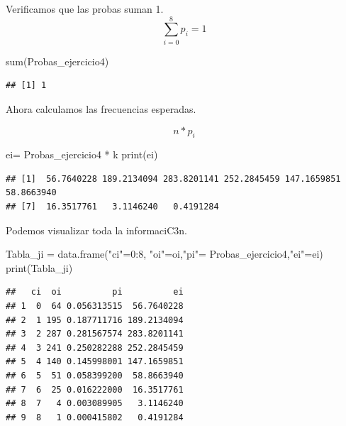 \documentclass[
]{article}
\newenvironment{Shaded}{\begin{snugshade}}{\end{snugshade}}
\newcommand{\DecValTok}[1]{\textcolor[rgb]{0.00,0.00,0.81}{#1}}
\newcommand{\FunctionTok}[1]{\textcolor[rgb]{0.00,0.00,0.00}{#1}}
\newcommand{\NormalTok}[1]{#1}
\newcommand{\OtherTok}[1]{\textcolor[rgb]{0.56,0.35,0.01}{#1}}
\newcommand{\SpecialCharTok}[1]{\textcolor[rgb]{0.00,0.00,0.00}{#1}}
\newcommand{\StringTok}[1]{\textcolor[rgb]{0.31,0.60,0.02}{#1}}
\begin{document}
Verificamos que las probas suman 1. \[\sum_{i=0}^{8} p_{i} = 1\]

\begin{Shaded}
\begin{Highlighting}[]
\FunctionTok{sum}\NormalTok{(Probas\_ejercicio4)}
\end{Highlighting}
\end{Shaded}

\begin{verbatim}
## [1] 1
\end{verbatim}

Ahora calculamos las frecuencias esperadas.

\[n * p_{i}\]

\begin{Shaded}
\begin{Highlighting}[]
\NormalTok{ei}\OtherTok{=}\NormalTok{ Probas\_ejercicio4 }\SpecialCharTok{*}\NormalTok{ k }
\FunctionTok{print}\NormalTok{(ei)}
\end{Highlighting}
\end{Shaded}

\begin{verbatim}
## [1]  56.7640228 189.2134094 283.8201141 252.2845459 147.1659851  58.8663940
## [7]  16.3517761   3.1146240   0.4191284
\end{verbatim}

Podemos visualizar toda la informaciC3n.

\begin{Shaded}
\begin{Highlighting}[]
\NormalTok{Tabla\_ji }\OtherTok{=} \FunctionTok{data.frame}\NormalTok{(}\StringTok{"ci"}\OtherTok{=}\DecValTok{0}\SpecialCharTok{:}\DecValTok{8}\NormalTok{, }\StringTok{"oi"}\OtherTok{=}\NormalTok{oi,}\StringTok{"pi"}\OtherTok{=}\NormalTok{ Probas\_ejercicio4,}\StringTok{"ei"}\OtherTok{=}\NormalTok{ei)}
\FunctionTok{print}\NormalTok{(Tabla\_ji)}
\end{Highlighting}
\end{Shaded}

\begin{verbatim}
##   ci  oi          pi          ei
## 1  0  64 0.056313515  56.7640228
## 2  1 195 0.187711716 189.2134094
## 3  2 287 0.281567574 283.8201141
## 4  3 241 0.250282288 252.2845459
## 5  4 140 0.145998001 147.1659851
## 6  5  51 0.058399200  58.8663940
## 7  6  25 0.016222000  16.3517761
## 8  7   4 0.003089905   3.1146240
## 9  8   1 0.000415802   0.4191284
\end{verbatim}
\end{document}
